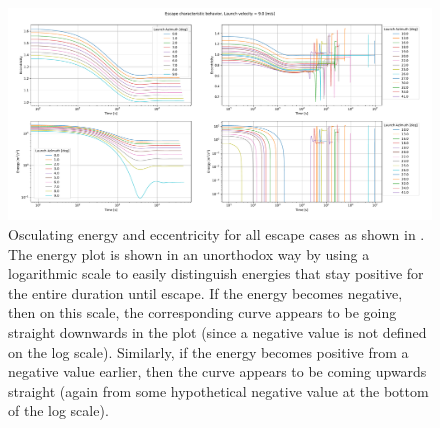 \begin{figure}[htb]
\centering
\captionsetup{justification=centering}
\includegraphics[angle=90, width=\textwidth, height=\textheight, keepaspectratio=true]{Images/longest_edge_no_perturbations/escape_energy_ecc_9ms.pdf}
\caption{Osculating energy and eccentricity for all escape cases as shown in \protect{}. The energy plot is shown in an unorthodox way by using a logarithmic scale to easily distinguish energies that stay positive for the entire duration until escape. If the energy becomes negative, then on this scale, the corresponding curve appears to be going straight downwards in the plot (since a negative value is not defined on the log scale). Similarly, if the energy becomes positive from a negative value earlier, then the curve appears to be coming upwards straight (again from some hypothetical negative value at the bottom of the log scale).}
\label{fig:energy_ecc_escape_9ms_noSP}
\end{figure}
\FloatBarrier
